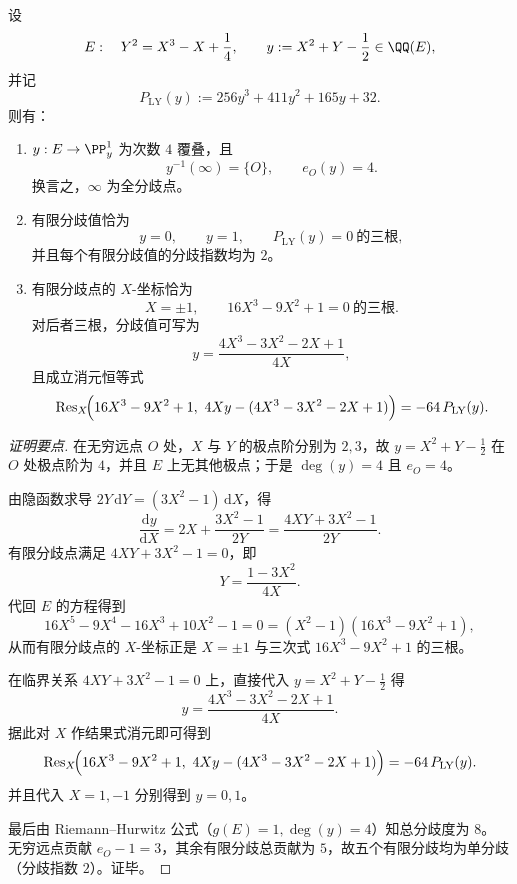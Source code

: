 \begin{conclusion}[四次重量覆叠的分歧全刻画与三点消元恒等式]\label{con:xi-terminal-zm-elliptic-y-hurwitz-passport}
设
\[
E:\quad Y^2=X^3-X+\frac14,\qquad
y:=X^2+Y-\frac12\in\QQ(E),
\]
并记
\[
P_{\mathrm{LY}}(y):=256y^3+411y^2+165y+32.
\]
则有：
\begin{enumerate}
  \item \(y:E\to\PP^1_y\) 为次数 \(4\) 覆叠，且
  \[
  y^{-1}(\infty)=\{O\},\qquad e_O(y)=4.
  \]
  换言之，\(\infty\) 为全分歧点。

  \item 有限分歧值恰为
  \[
  y=0,\qquad y=1,\qquad P_{\mathrm{LY}}(y)=0\ \text{的三根},
  \]
  并且每个有限分歧值的分歧指数均为 \(2\)。

  \item 有限分歧点的 \(X\)-坐标恰为
  \[
  X=\pm1,\qquad 16X^3-9X^2+1=0\ \text{的三根}.
  \]
  对后者三根，分歧值可写为
  \[
  y=\frac{4X^3-3X^2-2X+1}{4X},
  \]
  且成立消元恒等式
  \[
  \operatorname{Res}_X\!\Bigl(16X^3-9X^2+1,\ 4Xy-(4X^3-3X^2-2X+1)\Bigr)
  =-64\,P_{\mathrm{LY}}(y).
  \]
\end{enumerate}
\end{conclusion}
\begin{proof}[证明要点]
在无穷远点 \(O\) 处，\(X\) 与 \(Y\) 的极点阶分别为 \(2,3\)，故 \(y=X^2+Y-\tfrac12\) 在 \(O\) 处极点阶为 \(4\)，并且 \(E\) 上无其他极点；于是 \(\deg(y)=4\) 且 \(e_O=4\)。

由隐函数求导 \(2Y\,\mathrm dY=(3X^2-1)\,\mathrm dX\)，得
\[
\frac{\mathrm dy}{\mathrm dX}
=2X+\frac{3X^2-1}{2Y}
=\frac{4XY+3X^2-1}{2Y}.
\]
有限分歧点满足 \(4XY+3X^2-1=0\)，即
\[
Y=\frac{1-3X^2}{4X}.
\]
代回 \(E\) 的方程得到
\[
16X^5-9X^4-16X^3+10X^2-1=0
=(X^2-1)(16X^3-9X^2+1),
\]
从而有限分歧点的 \(X\)-坐标正是 \(X=\pm1\) 与三次式 \(16X^3-9X^2+1\) 的三根。

在临界关系 \(4XY+3X^2-1=0\) 上，直接代入 \(y=X^2+Y-\tfrac12\) 得
\[
y=\frac{4X^3-3X^2-2X+1}{4X}.
\]
据此对 \(X\) 作结果式消元即可得到
\[
\operatorname{Res}_X\!\Bigl(16X^3-9X^2+1,\ 4Xy-(4X^3-3X^2-2X+1)\Bigr)
=-64\,P_{\mathrm{LY}}(y).
\]
并且代入 \(X=1,-1\) 分别得到 \(y=0,1\)。

最后由 Riemann--Hurwitz 公式（\(g(E)=1,\deg(y)=4\)）知总分歧度为 \(8\)。
无穷远点贡献 \(e_O-1=3\)，其余有限分歧总贡献为 \(5\)，故五个有限分歧均为单分歧（分歧指数 \(2\)）。证毕。
\end{proof}
